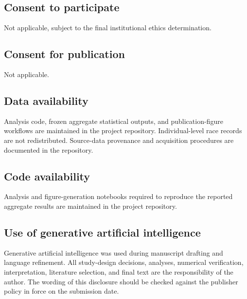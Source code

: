 \documentclass[pdflatex,sn-basic]{sn-jnl}
\begin{document}
\subsection*{Consent to participate}
Not applicable, subject to the final institutional ethics determination.
\subsection*{Consent for publication}
Not applicable.
\subsection*{Data availability}
Analysis code, frozen aggregate statistical outputs, and publication-figure workflows are maintained in the project repository. Individual-level race records are not redistributed. Source-data provenance and acquisition procedures are documented in the repository.
\subsection*{Code availability}
Analysis and figure-generation notebooks required to reproduce the reported aggregate results are maintained in the project repository.
\subsection*{Use of generative artificial intelligence}
Generative artificial intelligence was used during manuscript drafting and language refinement. All study-design decisions, analyses, numerical verification, interpretation, literature selection, and final text are the responsibility of the author. The wording of this disclosure should be checked against the publisher policy in force on the submission date.

\end{document}
